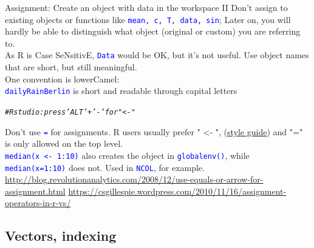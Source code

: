 \documentclass[xcolor=table,       handout,    xcolor=dvipsnames]{beamer}\usepackage[]{graphicx}\usepackage[]{color}
\makeatletter
\newcommand{\hlcom}[1]{\textcolor[rgb]{0,0.392,0}{\textit{#1}}}
\newenvironment{kframe}{%
 \def\at@end@of@kframe{}%
 \ifinner\ifhmode%
  \def\at@end@of@kframe{\end{minipage}}%
  \begin{minipage}{\columnwidth}%
 \fi\fi%
 \def\FrameCommand##1{\hskip\@totalleftmargin \hskip-\fboxsep
 \colorbox{shadecolor}{##1}\hskip-\fboxsep
     \hskip-\linewidth \hskip-\@totalleftmargin \hskip\columnwidth}%
 \MakeFramed {\advance\hsize-\width
   \@totalleftmargin\z@ \linewidth\hsize
   \@setminipage}}%
 {\par\unskip\endMakeFramed%
 \at@end@of@kframe}
\newenvironment{knitrout}{}{} %
\newcommand{\rcode}[1]{\texttt{\textcolor{Blue}{#1}}} %
\makeatother
\begin{document}
\begin{frame}[fragile]{Assignment:  Create an object with data in the workspace II}
Don't assign to existing objects or functions like \rcode{mean, c, T, data, sin}; \onslide<+-> Later on, you will hardly be able to distinguish what object (original or custom) you are referring to.\\ %
\onslide<+->
As R is Case SeNsitivE, \rcode{Data} would be OK, but it's not useful. Use object names that are short, but still meaningful.\\
\onslide<+->
One convention is lowerCamel:\\
\rcode{dailyRainBerlin} is short and readable through capital letters
\onslide<+->
\begin{knitrout}
\color{fgcolor}\begin{kframe}
\begin{alltt}
\hlcom{# Rstudio: press 'ALT' + '-'  for   " <- "}
\end{alltt}
\end{kframe}
\end{knitrout}
\onslide<+->
Don't use \rcode{=} for assignments. R users usually prefer " <- ", (\href{http://google-styleguide.googlecode.com/svn/trunk/Rguide.xml}{style guide}) and "=" is only allowed on the top level.\\ \onslide<+->
\rcode{median(x <- 1:10)} also creates the object in \rcode{globalenv()}, while \rcode{median(x=1:10)} does not.
Used in \rcode{NCOL}, for example.\\ 
\onslide<+->
\footnotesize{
\href{http://blog.revolutionanalytics.com/2008/12/use-equals-or-arrow-for-assignment.html}{http://blog.revolutionanalytics.com/2008/12/use-equals-or-arrow-for-assignment.html}
\href{https://csgillespie.wordpress.com/2010/11/16/assignment-operators-in-r-vs/}{https://csgillespie.wordpress.com/2010/11/16/assignment-operators-in-r-vs/}}
\end{frame}

\subsection{Vectors, indexing}
\end{document}
